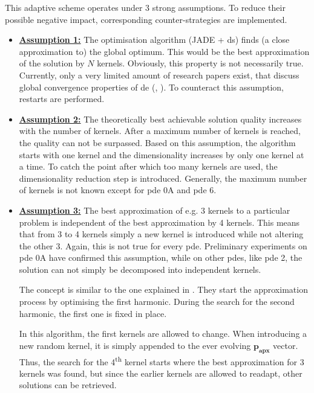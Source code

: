 \documentclass[./\jobname.tex]{subfiles}
\begin{document}
This adaptive scheme operates under 3 strong assumptions. To reduce their possible negative impact, corresponding counter-strategies are implemented. 
\begin{itemize}
	\item \underline{\textbf{Assumption 1:}} The optimisation algorithm (JADE + \gls{ds}) finds (a close approximation to) the global optimum. This would be the best approximation of the solution by $N$ kernels. Obviously, this property is not necessarily true. Currently, only a very limited amount of research papers exist, that discuss global convergence properties of \gls{de} (\cite{hu_sufficient_2013}, \cite{opara_differential_2019}). To counteract this assumption, restarts are performed. 
	\item \underline{\textbf{Assumption 2:}} The theoretically best achievable solution quality increases with the number of kernels. After a maximum number of kernels is reached, the quality can not be surpassed. Based on this assumption, the algorithm starts with one kernel and the dimensionality increases by only one kernel at a time. To catch the point after which too many kernels are used, the dimensionality reduction step is introduced. Generally, the maximum number of kernels is not known except for \gls{pde} 0A and \gls{pde} 6. 
	\item \underline{\textbf{Assumption 3:}} The best approximation of e.g. 3 kernels to a particular problem is independent of the best approximation by 4 kernels. This means that from 3 to 4 kernels simply a new kernel is introduced while not altering the other 3. Again, this is not true for every \gls{pde}. Preliminary experiments on \gls{pde} 0A have confirmed this assumption, while on other \gls{pde}s, like \gls{pde} 2, the solution can not simply be decomposed into independent kernels. 
	
	The concept is similar to the one explained in \cite{chaquet_solving_2012}. They start the approximation process by optimising the first harmonic. During the search for the second harmonic, the first one is fixed in place. 
	
	In this algorithm, the first kernels are allowed to change. When introducing a new random kernel, it is simply appended to the ever evolving $\mathbf{p_{apx}}$ vector. Thus, the search for the 4\textsuperscript{th} kernel starts where the best approximation for 3 kernels was found, but since the earlier kernels are allowed to readapt, other solutions can be retrieved.
\end{itemize} 
\end{document}
